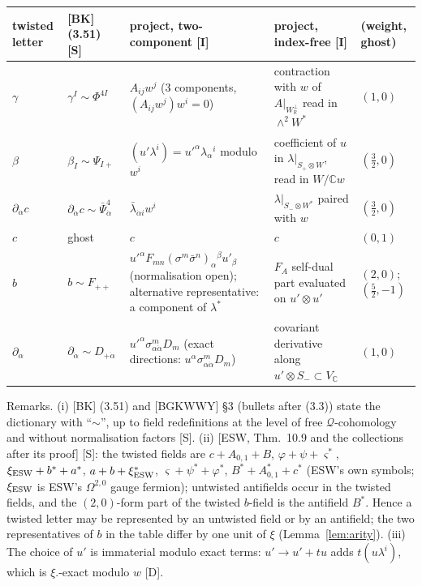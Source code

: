 \documentclass[11pt]{article}
\theoremstyle{definition}
\newcommand{\Sl}{\textup{[S]}}
\newcommand{\Dl}{\textup{[D]}}
\newcommand{\Il}{\textup{[I]}}
\begin{document}
\begin{longtable}{p{2.0cm}p{2.6cm}p{5.0cm}p{4.0cm}p{1.6cm}}
\toprule
twisted letter & [BK] (3.51) \Sl & project, two-component \Il & project, index-free \Il & (weight, ghost)\\
\midrule
$\gamma$ & $\gamma^I\sim\Phi^{4I}$ & $A_{ij}w^j$ ($3$ components, $(A_{ij}w^j)w^i=0$) & contraction with $w$ of $A|_{W_{\mathbb R}^\perp}$ read in $\wedge^2W^*$ & $(1,0)$\\
$\beta$ & $\beta_I\sim\Psi_{I+}$ & $(u'\lambda^i)=u'^\alpha\lambda_\alpha{}^i$ modulo $w^i$ & coefficient of $u$ in $\lambda|_{S_+\otimes W}$, read in $W/\mathbb Cw$ & $(\tfrac32,0)$\\
$\partial_{\dot\alpha}c$ & $\partial_{\dot\alpha}c\sim\bar\Psi^4_{\dot\alpha}$ & $\bar\lambda_{\dot\alpha i}w^i$ & $\lambda|_{S_-\otimes W^*}$ paired with $w$ & $(\tfrac32,0)$\\
$c$ & ghost & $c$ & $c$ & $(0,1)$\\
$b$ & $b\sim F_{++}$ & $u'^\alpha F_{mn}(\sigma^m\bar\sigma^n)_\alpha{}^\beta u'_\beta$ (normalisation open); alternative representative: a component of $\lambda^*$ & $F_A$ self-dual part evaluated on $u'\otimes u'$ & $(2,0)$; $(\tfrac52,-1)$\\
$\partial_{\dot\alpha}$ & $\partial_{\dot\alpha}\sim D_{+\dot\alpha}$ & $u'^\alpha\sigma^m_{\alpha\dot\alpha}D_m$ (exact directions: $u^\alpha\sigma^m_{\alpha\dot\alpha}D_m$) & covariant derivative along $u'\otimes S_-\subset V_{\mathbb C}$ & $(1,0)$\\
\bottomrule
\end{longtable}

Remarks. (i) [BK] (3.51) and [BGKWWY] \S3 (bullets after (3.3)) state the dictionary with ``$\sim$'', up to field redefinitions at the level of free $\mathcal Q$-cohomology and without normalisation factors \Sl. (ii) [ESW, Thm.~10.9 and the collections after its proof] \Sl: the twisted fields are $c+A_{0,1}+B$, $\varphi+\psi+\varsigma^*$, $\xi_{\rm ESW}+b^*+a^*$, $a+b+\xi_{\rm ESW}^*$, $\varsigma+\psi^*+\varphi^*$, $B^*+A^*_{0,1}+c^*$ (ESW's own symbols; $\xi_{\rm ESW}$ is ESW's $\Omega^{2,0}$ gauge fermion); untwisted antifields occur in the twisted fields, and the $(2,0)$-form part of the twisted $b$-field is the antifield $B^*$. Hence a twisted letter may be represented by an untwisted field or by an antifield; the two representatives of $b$ in the table differ by one unit of $\xi$ (Lemma~\ref{lem:arity}). (iii) The choice of $u'$ is immaterial modulo exact terms: $u'\to u'+tu$ adds $t(u\lambda^i)$, which is $\xi.$-exact modulo $w$ \Dl.
\end{document}
